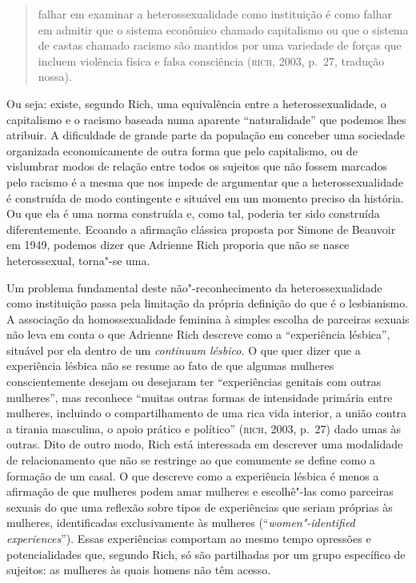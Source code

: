 \begin{quote}
falhar em examinar a heterossexualidade como instituição é como falhar
em admitir que o sistema econômico chamado capitalismo ou que o sistema
de castas chamado racismo são mantidos por uma variedade de forças que
incluem violência física e falsa consciência (\textsc{rich}, 2003, p.~27, tradução nossa).
\end{quote}

Ou seja: existe, segundo Rich, uma equivalência entre a
heterossexualidade, o capitalismo e o racismo baseada numa aparente
``naturalidade'' que podemos lhes atribuir. A dificuldade de grande
parte da população em conceber uma sociedade organizada economicamente
de outra forma que pelo capitalismo, ou de vislumbrar modos de relação
entre todos os sujeitos que não fossem marcados pelo racismo é a mesma
que nos impede de argumentar que a heterossexualidade é construída de
modo contingente e situável em um momento preciso da história. Ou que
ela é uma norma construída e, como tal, poderia ter sido construída
diferentemente. Ecoando a afirmação clássica proposta por Simone de
Beauvoir em 1949, podemos dizer que Adrienne Rich proporia que não se
nasce heterossexual, torna"-se uma.

Um problema fundamental deste não"-reconhecimento da heterossexualidade
como instituição passa pela limitação da própria definição do que é o
lesbianismo. A associação da homossexualidade feminina à simples escolha
de parceiras sexuais não leva em conta o que Adrienne Rich descreve como
a ``experiência lésbica'', situável por ela dentro de um \emph{continuum
lésbico.} O que quer dizer que a experiência lésbica não se resume ao
fato de que algumas mulheres conscientemente desejam ou desejaram ter
``experiências genitais com outras mulheres'', mas reconhece ``muitas
outras formas de intensidade primária entre mulheres, incluindo o
compartilhamento de uma rica vida interior, a união contra a tirania
masculina, o apoio prático e político'' (\textsc{rich}, 2003, p.~27) dado umas
às outras. Dito de outro modo, Rich está interessada em descrever uma
modalidade de relacionamento que não se restringe ao que comumente se
define como a formação de um casal. O que descreve como a experiência
lésbica é menos a afirmação de que mulheres podem amar mulheres e
escolhê"-las como parceiras sexuais do que uma reflexão sobre tipos de
experiências que seriam próprias às mulheres, identificadas
exclusivamente às mulheres (``\emph{women"-identified experiences}'').
Essas experiências comportam ao mesmo tempo opressões e potencialidades
que, segundo Rich, só são partilhadas por um grupo específico de
sujeitos: as mulheres às quais homens não têm acesso.

